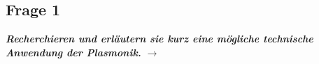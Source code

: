 \subsection{\label{subsec:FZV1}Frage 1}
\textbf{\textit{Recherchieren und erläutern sie kurz eine mögliche technische Anwendung der
Plasmonik.}}
$\rightarrow$